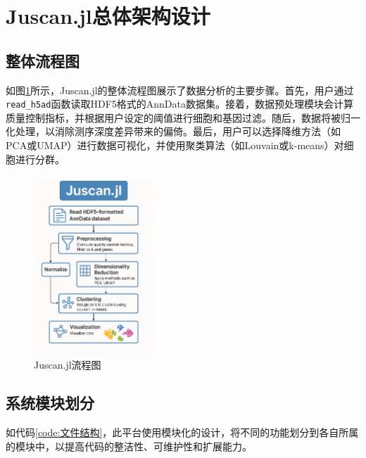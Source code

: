 \section{Juscan.jl总体架构设计}

\subsection{整体流程图}

如图\ref{img:flow}所示，Juscan.jl的整体流程图展示了数据分析的主要步骤。首先，用户通过\lstinline|read_h5ad|函数读取HDF5格式的AnnData数据集。接着，数据预处理模块会计算质量控制指标，并根据用户设定的阈值进行细胞和基因过滤。随后，数据将被归一化处理，以消除测序深度差异带来的偏倚。最后，用户可以选择降维方法（如PCA或UMAP）进行数据可视化，并使用聚类算法（如Louvain或k-means）对细胞进行分群。

\begin{figure}[h]
  \centering
  \includegraphics[width=0.4\textwidth]{img/flow_chart.png}
  \caption{Juscan.jl流程图}
  \label{img:flow}
\end{figure}

\subsection{系统模块划分}

如代码\ref{code:文件结构}，此平台使用模块化的设计，将不同的功能划分到各自所属的模块中，以提高代码的整洁性、可维护性和扩展能力。

